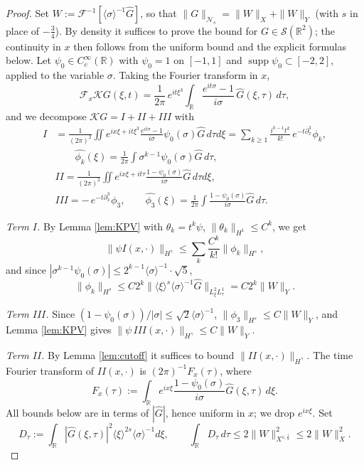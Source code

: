 \documentclass[10pt,reqno]{amsart}
\theoremstyle{remark}
\numberwithin{equation}{section}
\newcommand{\R}{\mathbb R}
\newcommand{\pd}{\partial}
\newcommand{\ga}{\gamma}
\newcommand{\supp}{\operatorname{supp}}
\newcommand{\lan}{\langle}
\newcommand{\ran}{\rangle}
\newcommand{\Kc}{\mathcal{K}}
\newcommand{\F}{\mathcal{F}}
\newcommand{\sig}{\sigma}
\begin{document}
\begin{proof}
Set $W:=\F^{-1}[\lan\sig\ran^{-1}\widehat G]$, so that $\|G\|_{\mathcal N_s}=\|W\|_{X}+\|W\|_{Y}$ (with $s$ in place of $-\frac34$). By density it suffices to prove the bound for $G\in\mathcal S(\R^2)$; the continuity in $x$ then follows from the uniform bound and the explicit formulas below. Let $\psi_0\in C_c^\infty(\R)$ with $\psi_0=1$ on $[-1,1]$ and $\supp\psi_0\subset[-2,2]$, applied to the variable $\sig$. Taking the Fourier transform in $x$,
$$\mathcal{F}_x {\Kc G}(\xi,t)=\frac{1}{2\pi}\, e^{it\xi^3}\int_\R\frac{e^{it\sig}-1}{i\sig}\,\widehat G(\xi,\tau)\,d\tau ,$$
and we decompose $\Kc G=I+II+III$ with
\begin{align*}
I&=\frac{1}{(2\pi)^2}\iint e^{ix\xi+it\xi^3}\frac{e^{it\sig}-1}{i\sig}\psi_0(\sig)\widehat G\,d\tau d\xi
=\sum_{k\ge1}\frac{i^{k-1}t^k}{k!}\,e^{-t\pd_x^3}\phi_k,\\ 
&\quad \quad \widehat{\phi_k}(\xi)=\frac1{2\pi}\int\sig^{k-1}\psi_0(\sig)\widehat G\,d\tau,\\
&II=\frac{1}{(2\pi)^2}\iint e^{ix\xi+it\tau}\frac{1-\psi_0(\sig)}{i\sig}\widehat G\,d\tau d\xi,\\
&III=-\,e^{-t\pd_x^3}\phi_3,\qquad \widehat{\phi_3}(\xi)=\frac1{2\pi}\int\frac{1-\psi_0(\sig)}{i\sig}\widehat G\,d\tau .
\end{align*}

\emph{Term $I$.} By Lemma \ref{lem:KPV} with $\theta_k=t^k\psi$, $\|\theta_k\|_{H^1}\le C^k$, we get $$\|\psi I(x,\cdot)\|_{H^\ga}\le\sum_k\frac{C^k}{k!}\|\phi_k\|_{H^s},$$ and since $|\sig^{k-1}\psi_0(\sig)|\le 2^{k-1}\lan\sig\ran^{-1}\cdot\sqrt5$,
$$\|\phi_k\|_{H^s}\le C2^{k}\big\|\lan\xi\ran^s\lan\sig\ran^{-1}\widehat G\big\|_{L^2_\xi L^1_\tau}=C2^k\|W\|_Y .$$

\emph{Term $III$.} Since $(1-\psi_0(\sig))/|\sig|\le\sqrt2\lan\sig\ran^{-1}$, $\|\phi_3\|_{H^s}\le C\|W\|_Y$, and Lemma \ref{lem:KPV} gives $\|\psi\, III(x,\cdot)\|_{H^\ga}\le C\|W\|_Y$.

\emph{Term $II$.} By Lemma \ref{lem:cutoff} it suffices to bound $\|II(x,\cdot)\|_{H^\ga}$. The time Fourier transform of $II(x,\cdot)$ is $(2\pi)^{-1}F_x(\tau)$, where
$$F_x(\tau):=\int_\R e^{ix\xi}\frac{1-\psi_0(\sig)}{i\sig}\widehat G(\xi,\tau)\,d\xi .$$
All bounds below are in terms of $|\widehat G|$, hence uniform in $x$; we drop $e^{ix\xi}$. Set
$$D_\tau:=\int_\R|\widehat G(\xi,\tau)|^2\lan\xi\ran^{2s}\lan\sig\ran^{-1}d\xi,\qquad \int_\R D_\tau\,d\tau\le 2\|W\|^2_{X^{s,\frac12}}\le2\|W\|_X^2 .$$


\end{proof}
\end{document}

